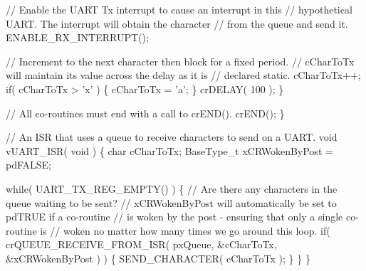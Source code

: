 \begin{DoxyPre}        // Enable the UART Tx interrupt to cause an interrupt in this
     // hypothetical UART.  The interrupt will obtain the character
     // from the queue and send it.
     ENABLE\_RX\_INTERRUPT();\end{DoxyPre}



\begin{DoxyPre}     // Increment to the next character then block for a fixed period.
     // cCharToTx will maintain its value across the delay as it is
     // declared static.
     cCharToTx++;
     if( cCharToTx > 'x' )
     \{
        cCharToTx = 'a';
     \}
     crDELAY( 100 );
    \}\end{DoxyPre}



\begin{DoxyPre}    // All co-routines must end with a call to crEND().
    crEND();
\}\end{DoxyPre}



\begin{DoxyPre}// An ISR that uses a queue to receive characters to send on a UART.
void vUART\_ISR( void )
\{
char cCharToTx;
BaseType\_t xCRWokenByPost = pdFALSE;\end{DoxyPre}



\begin{DoxyPre}    while( UART\_TX\_REG\_EMPTY() )
    \{
        // Are there any characters in the queue waiting to be sent?
     // xCRWokenByPost will automatically be set to pdTRUE if a co-routine
     // is woken by the post - ensuring that only a single co-routine is
     // woken no matter how many times we go around this loop.
        if( crQUEUE\_RECEIVE\_FROM\_ISR( pxQueue, \&cCharToTx, \&xCRWokenByPost ) )
     \{
         SEND\_CHARACTER( cCharToTx );
     \}
    \}
\}\end{DoxyPre}
 